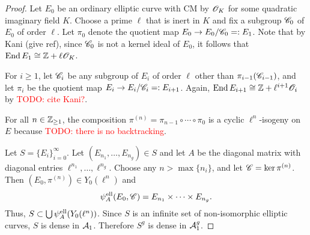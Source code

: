 \documentclass{amsart}
\begin{document}
\begin{proof}
 Let $E_0$ be an ordinary elliptic curve with CM by $\mathscr{O}_K$ for some quadratic imaginary field $K$. Choose a prime $\ell$ that is inert in $K$ and fix a subgroup $\mathscr{C}_0$ of $E_0$ of order $\ell$. Let $\pi_0$ denote the quotient map $E_0 \to E_0/\mathscr{C}_0 =: E_1$. Note that by Kani (give ref), since $\mathscr{C}_0$ is not a kernel ideal of $E_0$, it follows that $\operatorname{End} E_1 \cong \mathbb{Z} + \ell\mathscr{O}_K$.

 For $i \ge 1$, let $\mathscr{C}_i$ be any subgroup of $E_i$ of order $\ell$ other than $\pi_{i-1}(\mathscr{C}_{i-1})$, and let $\pi_i$ be the quotient map $E_i \to E_i/\mathscr{C}_i =: E_{i+1}$. Again, $\operatorname{End} E_{i+1} \cong \mathbb{Z} + \ell^{i+1}\mathscr{O}_{i}$ by \textcolor{red}{TODO: cite Kani?}.

 For all $n \in \mathbb{Z}_{\ge 1}$, the composition $\pi^{(n)} = \pi_{n-1} \circ \cdots \circ \pi_0$ is a cyclic $\ell^n$-isogeny on $E$ because \textcolor{red}{TODO: there is no backtracking}.

 Let $S = \{E_i\}_{i=0}^\infty$. Let $(E_{n_1},\dots,E_{n_g}) \in S$ and let $A$ be the diagonal matrix with diagonal entries $\ell^{n_1},\dots,\ell^{n_g}$.  Choose any $n > \max\{n_i\}$, and let $\mathscr{C} = \ker \pi^{(n)}$. Then $(E_0,\pi^{(n)}) \in Y_0(\ell^n)$ and
 \[
   \psi_{A}^\mathrm{ell}(E_0,\mathscr{C}) = E_{n_1} \times \cdots \times E_{n_g}.
 \]
Thus, $S \subset \bigcup\psi_{A}^\mathrm{ell}(Y_0(\ell^n))$. Since $S$ is an infinite set of non-isomorphic elliptic curves, $S$ is dense in $\mathcal{A}_1$. Therefore $S^g$ is dense in $\mathcal{A}_1^g$.
\end{proof}



\end{document}
